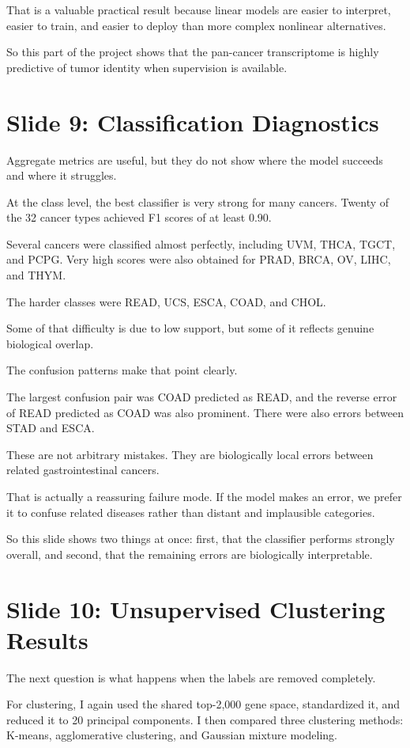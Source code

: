 \documentclass[12pt]{article}
\begin{document}
That is a valuable practical result because linear models are easier to interpret, easier to train, and easier to deploy than more complex nonlinear alternatives.

So this part of the project shows that the pan-cancer transcriptome is highly predictive of tumor identity when supervision is available.

\section{Slide 9: Classification Diagnostics}
Aggregate metrics are useful, but they do not show where the model succeeds and where it struggles.

At the class level, the best classifier is very strong for many cancers. Twenty of the 32 cancer types achieved F1 scores of at least 0.90.

Several cancers were classified almost perfectly, including UVM, THCA, TGCT, and PCPG. Very high scores were also obtained for PRAD, BRCA, OV, LIHC, and THYM.

The harder classes were READ, UCS, ESCA, COAD, and CHOL.

Some of that difficulty is due to low support, but some of it reflects genuine biological overlap.

The confusion patterns make that point clearly.

The largest confusion pair was COAD predicted as READ, and the reverse error of READ predicted as COAD was also prominent. There were also errors between STAD and ESCA.

These are not arbitrary mistakes. They are biologically local errors between related gastrointestinal cancers.

That is actually a reassuring failure mode. If the model makes an error, we prefer it to confuse related diseases rather than distant and implausible categories.

So this slide shows two things at once: first, that the classifier performs strongly overall, and second, that the remaining errors are biologically interpretable.

\section{Slide 10: Unsupervised Clustering Results}
The next question is what happens when the labels are removed completely.

For clustering, I again used the shared top-2,000 gene space, standardized it, and reduced it to 20 principal components. I then compared three clustering methods: K-means, agglomerative clustering, and Gaussian mixture modeling.
\end{document}
